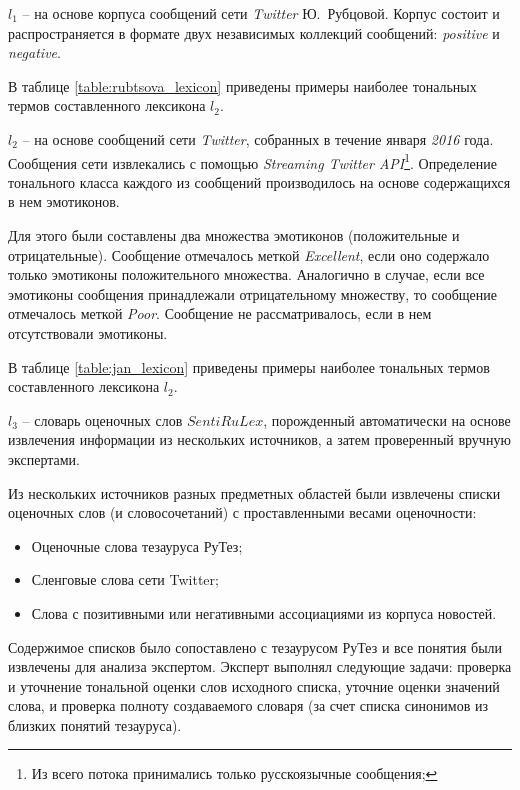 $l_1$ -- на основе корпуса сообщений сети {\it Twitter} Ю.~Рубцовой.
Корпус состоит и распространяется в формате двух независимых коллекций
сообщений: {\it positive} и {\it negative}.

В таблице \ref{table:rubtsova_lexicon} приведены примеры наиболее тональных
термов составленного лексикона $l_2$.


$l_2$ -- на основе сообщений сети {\it Twitter}, собранных в течение января {\it 2016} года.
Сообщения сети извлекались с помощью {\it Streaming Twitter API}\footnote{
    Из всего потока принимались только русскоязычные сообщения;
}.
Определение тонального класса каждого из сообщений производилось на
основе содержащихся в нем эмотиконов.

Для этого были составлены два множества эмотиконов (положительные и отрицательные).
Сообщение отмечалось меткой {\it Excellent}, если оно содержало
только эмотиконы положительного множества.
Аналогично в случае, если все эмотиконы сообщения принадлежали
отрицательному множеству, то сообщение отмечалось меткой {\it Poor}.
Сообщение не рассматривалось, если в нем отсутствовали эмотиконы.

В таблице \ref{table:jan_lexicon} приведены примеры наиболее тональных термов
составленного лексикона $l_2$.


$l_3$ -- словарь оценочных слов $SentiRuLex$, порожденный
автоматически на основе извлечения информации из нескольких источников,
а затем проверенный вручную экспертами.

Из нескольких источников разных предметных областей были
извлечены списки оценочных слов (и словосочетаний) с проставленными
весами оценочности:
\begin{itemize}
    \item Оценочные слова тезауруса РуТез;
    \item Сленговые слова сети Twitter;
    \item Слова с позитивными или негативными ассоциациями из корпуса новостей.
\end{itemize}
Содержимое списков было сопоставлено с тезаурусом РуТез и все понятия
были извлечены для анализа экспертом.
Эксперт выполнял следующие задачи:
проверка и уточнение тональной оценки слов исходного списка,
уточние оценки значений слова,
и проверка полноту создаваемого словаря (за счет списка синонимов из
близких понятий тезауруса).


